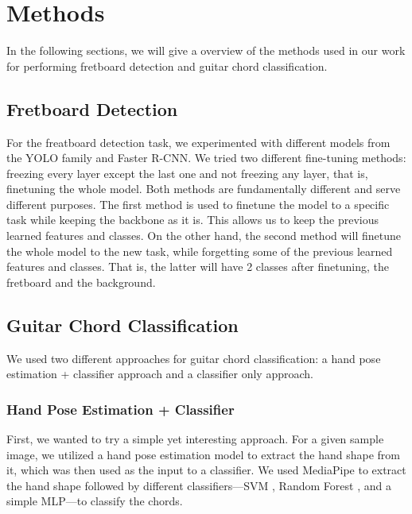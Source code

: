 \documentclass[10pt,twocolumn,letterpaper]{article}
\begin{document}
\section{Methods}
In the following sections, we will give a overview of the methods used in our work for performing fretboard detection and guitar chord classification.

\subsection{Fretboard Detection}
For the freatboard detection task, we experimented with different models from the YOLO family and Faster R-CNN. We tried two different fine-tuning methods: freezing every layer except the last one and not freezing any layer, that is, finetuning the whole model. Both methods are fundamentally different and serve different purposes. The first method is used to finetune the model to a specific task while keeping the backbone as it is. This allows us to keep the previous learned features and classes. On the other hand, the second method will finetune the
whole model to the new task, while forgetting some of the previous learned features and classes. That is, the latter will have 2 classes after finetuning, the fretboard and the background.


\subsection{Guitar Chord Classification}
We used two different approaches for guitar chord classification: a hand pose estimation + classifier approach and a classifier only approach.

\subsubsection{Hand Pose Estimation + Classifier}
First, we wanted to try a simple yet interesting approach. For a given sample image, we utilized a hand pose estimation model to extract the hand shape from it, which was then used as the input to a classifier. We used MediaPipe to extract the hand shape followed by different classifiers—SVM \cite{cortes1995support}, Random Forest \cite{ho1995random}, and a simple MLP—to classify the chords.

\end{document}
